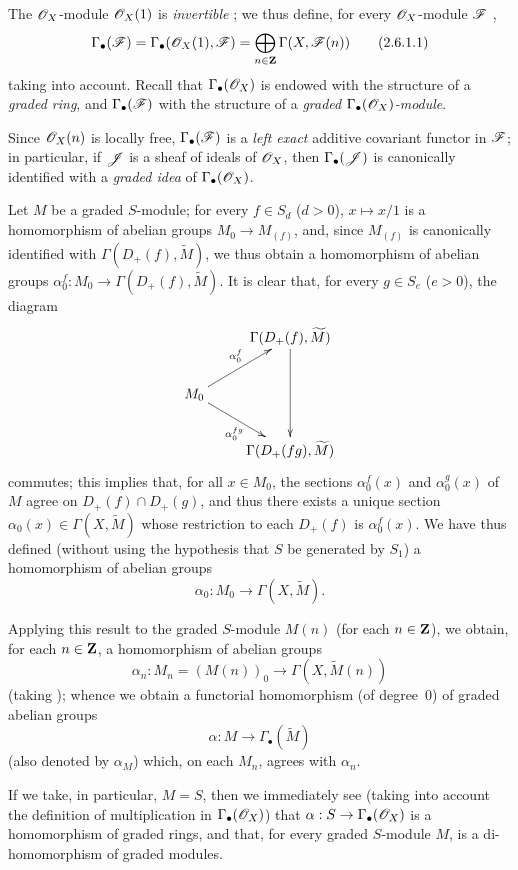 \begin{env}[2.6.1]
\label{II.2.6.1}
The $\mathscr{O}_X$-module $\mathscr{O}_X(1)$ is \emph{invertible} ;
we thus define, for every $\mathscr{O}_X$-module $\mathscr{F}$ ,
\[
\label{II.2.6.1.1}
  \Gamma_\bullet(\mathscr{F})
  = \Gamma_\bullet(\mathscr{O}_X(1),\mathscr{F})
  = \bigoplus_{n\in\mathbf{Z}} \Gamma(X,\mathscr{F}(n))
\tag{2.6.1.1}
\]
taking  into account.
Recall  that $\Gamma_\bullet(\mathscr{O}_X)$ is endowed with the structure of a \emph{graded ring}, and $\Gamma_\bullet(\mathscr{F})$ with the structure of a \emph{graded $\Gamma_\bullet(\mathscr{O}_X)$-module}.

Since $\mathscr{O}_X(n)$ is locally free, $\Gamma_\bullet(\mathscr{F})$ is a \emph{left exact} additive covariant functor in $\mathscr{F}$;
in particular, if $\mathscr{J}$ is a sheaf of ideals of $\mathscr{O}_X$, then $\Gamma_\bullet(\mathscr{J})$ is canonically identified with a \emph{graded idea} of $\Gamma_\bullet(\mathscr{O}_X)$.
\end{env}

\begin{env}[2.6.2]
\label{II.2.6.2}
Let $M$ be a graded $S$-module;
for every $f\in S_d$ ($d>0$), $x\mapsto x/1$ is a homomorphism of abelian groups $M_0\to M_{(f)}$, and, since $M_{(f)}$ is canonically identified
with $\Gamma(D_+(f),\widetilde{M})$, we thus obtain a homomorphism of abelian groups $\alpha_0^f: M_0\to\Gamma(D_+(f),\widetilde{M})$.
It is clear that, for every $g\in S_e$ ($e>0$), the diagram
\[
  \xymatrix{
    & \Gamma(D_+(f),\widetilde{M}) \ar[dd]
  \\M_0 \ar[ur]^{\alpha_0^f} \ar[dr]_{\alpha_0^{fg}}
  \\& \Gamma(D_+(fg),\widetilde{M})
  }
\]
commutes;
this implies that, for all $x\in M_0$, the sections $\alpha_0^f(x)$ and $\alpha_0^g(x)$ of $M$ agree on $D_+(f)\cap D_+(g)$, and thus there exists a unique section $\alpha_0(x)\in\Gamma(X,\widetilde{M})$ whose restriction to each $D_+(f)$ is $\alpha_0^f(x)$.
We have thus defined (without using the hypothesis that $S$ be generated by $S_1$) a homomorphism of abelian groups
\[
\label{II.2.6.2.1}
  \alpha_0: M_0\to\Gamma(X,\widetilde{M}).
\tag{2.6.2.1}
\]

Applying this result to the graded $S$-module $M(n)$ (for each $n\in\mathbf{Z}$), we obtain, for each $n\in\mathbf{Z}$, a homomorphism of abelian groups
\[
\label{II.2.6.2.2}
  \alpha_n: M_n=(M(n))_0\to\Gamma(X,\widetilde{M}(n))
\tag{2.6.2.2}
\]
(taking );
whence we obtain a functorial homomorphism (of degree~$0$) of graded abelian groups
\[
\label{II.2.6.2.3}
  \alpha: M\to\Gamma_\bullet(\widetilde{M})
\tag{2.6.2.3}
\]
(also denoted by $\alpha_M$) which, on each $M_n$, agrees with $\alpha_n$.

If we take, in particular, $M=S$, then we immediately see (taking into account the definition  of multiplication in $\Gamma_\bullet(\mathscr{O}_X)$) that $\alpha: S\to\Gamma_\bullet(\sh{O}_X)$ is a homomorphism of graded rings, and that, for every graded $S$-module $M$,  is a di-homomorphism of graded modules.
\end{env}

